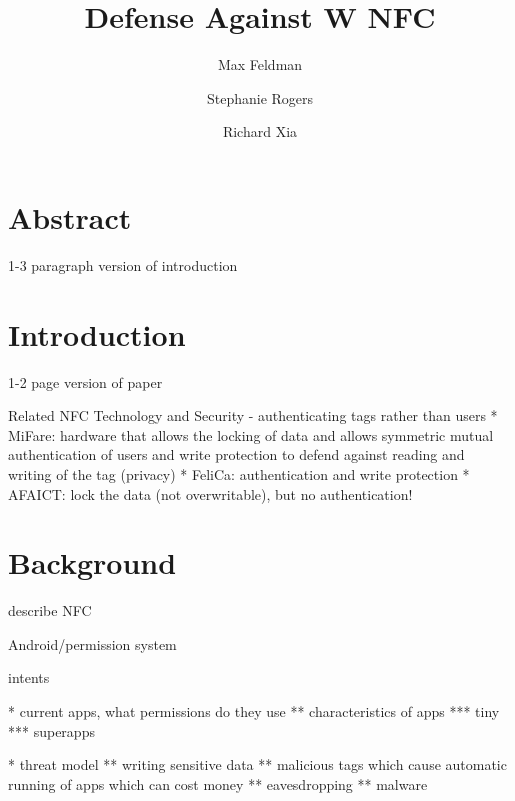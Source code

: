 \documentclass[12pt]{article}
\begin{document}
\title{Defense Against W NFC}
\author{Max Feldman \and Stephanie Rogers \and Richard Xia}
\maketitle

\section{Abstract}
1-3 paragraph version of introduction

\section{Introduction}
1-2 page version of paper

Related NFC Technology and Security - authenticating tags rather than users
* MiFare: hardware that allows the locking of data and allows symmetric mutual authentication of users and write protection to defend against reading and writing of the tag (privacy)
* FeliCa: authentication and write protection 
* AFAICT: lock the data (not overwritable), but no authentication!

\section{Background}
describe NFC

Android/permission system

intents

* current apps, what permissions do they use
** characteristics of apps
*** tiny
*** superapps

* threat model
** writing sensitive data
** malicious tags which cause automatic running of apps which can cost money
** eavesdropping
** malware
\end{document}

